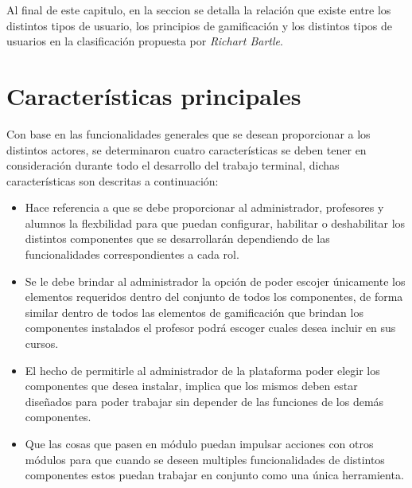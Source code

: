     \noindent 
    Al final de este capitulo, en la seccion  se detalla
    la relación que existe entre los distintos tipos de usuario, los principios de
    gamificación y los distintos tipos de usuarios en la clasificación propuesta por
    {\it Richart Bartle}.


\section{Características principales}

 Con base en las funcionalidades generales que se desean proporcionar a los distintos
 actores, se determinaron cuatro características se deben tener en consideración durante
 todo el desarrollo del trabajo terminal, dichas características son descritas a continuación:


    \begin{multicols}{2}
    \begin{itemize}

    \item[] Hace referencia a que se debe proporcionar al administrador, profesores
            y alumnos la flexbilidad para que puedan configurar, habilitar o deshabilitar
            los distintos componentes que se desarrollarán dependiendo de las funcionalidades
            correspondientes a cada rol.

        
    \item[] Se le debe brindar al administrador la opción de poder escojer únicamente los
            elementos requeridos dentro del conjunto de todos los componentes, de forma similar
            dentro de todos las elementos de gamificación que brindan los componentes instalados
            el profesor podrá escoger cuales desea incluir en sus cursos.



    \item[] El hecho de permitirle al administrador de la plataforma poder elegir los
            componentes que desea instalar, implica que los mismos deben estar diseñados
            para poder trabajar sin depender de las funciones de los demás componentes.


    \item[] Que las cosas que pasen en módulo puedan impulsar acciones con otros módulos
            para que cuando se deseen multiples funcionalidades de distintos componentes
            estos puedan trabajar en conjunto como una única herramienta.
    \end{itemize}
    \end{multicols}
